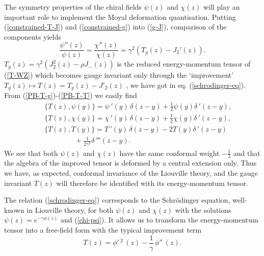 \documentclass[a4paper,12pt]{article}
\begin{document}
\noindent
The symmetry properties of the chiral fields $\psi(z)$ and
$\chi(z)$ will play an important role to implement the Moyal
deformation quantisation.
Putting  (\ref{constrained-T-J}) and
(\ref{constrained-g}) into
(\ref{g-J}), comparison of the components  yields
\begin{equation}\label{schrodinger-eq}
\frac{\psi''(z)}{\psi(z)}=\frac{\chi''(z)}{\chi(z)}=
\gamma^2 (T_g(z)-J_2'(z)).
\end{equation}
$T_g(z)=\gamma^2(J_2^2(z)-\rho J_-(z))$ is the reduced
energy-momentum tensor of (\ref{T-WZ}) which becomes gauge invariant
only through the `improvement' $T_g(z) \mapsto T(z) =T_g(z) -J'_2(z)$
\cite{JPP},  we have  got in eq. (\ref{schrodinger-eq}).
From (\ref{PB-T-g})-(\ref{PB-T-T}) we easily find
\begin{eqnarray}\label{PB-T-psi}
&&\{T (z),\psi(y)\}=\psi\,'(y)\,\delta (z-y) +\frac{1}{2}
\psi(y)\delta\,'(z-y),\\
\label{PB-T-psi1}
&&\{T (z),\chi(y)\}=\chi\,'(y)\,\delta (z-y) +\frac{1}{2}
\chi(y)\delta\,'(z-y),\\
\label{PB-T-T,L}
&&\{T (z), T(y)\}=
T\,'(y)\,\delta (z-y) -2T(y)\delta\,'(z-y)\\
\nonumber
&&~~~~~~~~~~~~~~~~~~~+\frac{1}{2\gamma^2}\delta\,'''(z-y).
\end{eqnarray}
We see that both $\psi(z)$ and $\chi(z)$ have the same
conformal weight $-\frac{1}{2}$ and that the algebra of the improved
tensor is deformed by a central extension only.  Thus we have, as
expected, conformal invariance of the Liouville theory, and the gauge
invariant $T(z)$ will therefore be identified with its energy-momentum
tensor.

\noindent
The relation (\ref{schrodinger-eq}) corresponds to the Schr\"odinger
equation, well-known in Liouville theory, for both $\psi(z)$ and
$\chi(z)$ with the solutions $\psi(z)=e^{-\gamma\phi(z)}$ and
(\ref{chi-psi}).  It allows us to transform the energy-momentum tensor
into a free-field form with the typical improvement term
\begin{equation}\label{T-phi}
T(z) =\phi'\,^2\,(z)-\frac{1}{\gamma}\,\phi''\,(z).
\end{equation}
\end{document}
